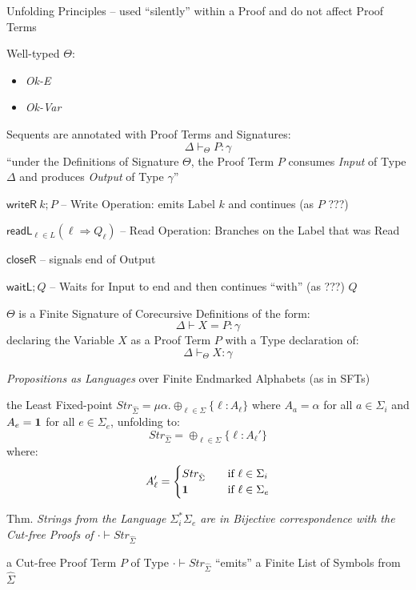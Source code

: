 Unfolding Principles -- used ``silently'' within a Proof and do not
affect Proof Terms %

Well-typed $\Theta$:
\begin{itemize}
  \item \emph{Ok-E}
  \item \emph{Ok-Var}
\end{itemize}

Sequents are annotated with Proof Terms and Signatures:
\[
  \Delta \vdash_\Theta P:\gamma
\]
``under the Definitions of Signature $\Theta$, the Proof Term $P$
consumes \emph{Input} of Type $\Delta$ and produces \emph{Output} of
Type $\gamma$''

$\mathsf{writeR}\ k;P$ -- Write Operation: emits Label $k$ and
continues (as $P$ ???) %

$\mathsf{readL}_{\ell\in{L}}(\ell \Rightarrow Q_\ell)$ -- Read
Operation: Branches on the Label that was Read

$\mathsf{closeR}$ -- signals end of Output

$\mathsf{waitL};Q$ -- Waits for Input to end and then continues
``with'' (as ???) $Q$ %

$\Theta$ is a Finite Signature of Corecursive Definitions of the form:
\[
  \Delta \vdash X = P : \gamma
\]
declaring the Variable $X$ as a Proof Term $P$ with a Type declaration
of:
\[
  \Delta \vdash_\Theta X : \gamma
\]

\emph{Propositions as Languages} over Finite Endmarked Alphabets (as
in SFTs)

the Least Fixed-point $Str_{\hat{\Sigma}} =
\mu\alpha.\oplus_{\ell\in\Sigma}\{\ell:A_\ell\}$ where $A_a = \alpha$
for all $a\in\Sigma_i$ and $A_e = \mathbf{1}$ for all $e \in \Sigma_e$,
unfolding to:
\[
  Str_{\hat{\Sigma}} = \oplus_{\ell\in\Sigma}\{\ell:A_\ell'\}
\]
where:
\[
  A_\ell' =
  \begin{cases}
    Str_{\hat{\Sigma}}
      & \quad \text{if $\ell\in\Sigma_i$} \\
    \mathbf{1} & \quad \text{if $\ell\in\Sigma_e$} \\
  \end{cases}
\]

Thm. \emph{Strings from the Language $\Sigma_i^*\Sigma_e$ are in
  Bijective correspondence with the Cut-free Proofs of $\cdot\vdash
  Str_{\hat{\Sigma}}$}

a Cut-free Proof Term $P$ of Type $\cdot\vdash Str_{\hat{\Sigma}}$
``emits'' a Finite List of Symbols from $\hat{\Sigma}$

